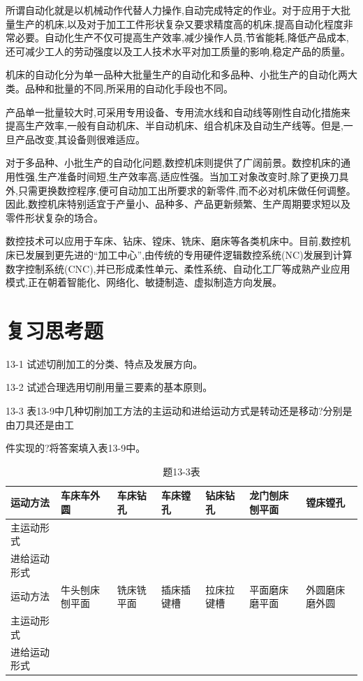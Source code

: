 \documentclass[UTF8]{ctexbook}
\newcommand{\◎}{\ensuremath{\bigcirc}}
\begin{document}
所谓自动化就是以机械动作代替人力操作,自动完成特定的作业。对于应用于大批量生产的机床,以及对于加工工件形状复杂又要求精度高的机床,提高自动化程度非常必要。自动化生产不仅可提高生产效率,减少操作人员,节省能耗,降低产品成本,还可减少工人的劳动强度以及工人技术水平对加工质量的影响,稳定产品的质量。

机床的自动化分为单一品种大批量生产的自动化和多品种、小批生产的自动化两大类。品种和批量的不同,所采用的自动化手段也不同。

产品单一批量较大时,可采用专用设备、专用流水线和自动线等刚性自动化措施来提高生产效率,一般有自动机床、半自动机床、组合机床及自动生产线等。但是,一旦产品改变,其设备则很难适应。

对于多品种、小批生产的自动化问题,数控机床则提供了广阔前景。数控机床的通用性强,生产准备时间短,生产效率高,适应性强。当加工对象改变时,除了更换刀具外,只需更换数控程序,便可自动加工出所要求的新零件,而不必对机床做任何调整。因此,数控机床特别适宜于产量小、品种多、产品更新频繁、生产周期要求短以及零件形状复杂的场合。

数控技术可以应用于车床、钻床、镗床、铣床、磨床等各类机床中。目前,数控机床已发展到更先进的“加工中心”,由传统的专用硬件逻辑数控系统(NC)发展到计算数字控制系统(CNC),并已形成柔性单元、柔性系统、自动化工厂等成熟产业应用模式,正在朝着智能化、网络化、敏捷制造、虚拟制造方向发展。

\section*{复习思考题}

 
13-1 试述切削加工的分类、特点及发展方向。

13-2 试述合理选用切削用量三要素的基本原则。

13-3 表13-9中几种切削加工方法的主运动和进给运动方式是转动还是移动?分别是由刀具还是由工

件实现的?将答案填入表13-9中。

\begin{table}[H]
\centering
\caption{题13-3表}
\label{tab:13-9}
\begin{tabular}{|m{2cm}|m{2cm}|m{2cm}|m{2cm}|m{2cm}|m{2cm}|m{2cm}|}
\hline
运动方法 & 车床车外圆 & 车床钻孔 & 车床镗孔 & 钻床钻孔 & 龙门刨床刨平面 & 镗床镗孔 \\
\hline
主运动形式 & & & & & & \\
\hline
进给运动形式 & & & & & & \\
\hline
\hline
运动方法 & 牛头刨床刨平面 & 铣床铣平面 & 插床插键槽 & 拉床拉键槽 & 平面磨床磨平面 & 外圆磨床磨外圆 \\
\hline
主运动形式 & & & & & & \\
\hline
进给运动形式 & & & & & & \\
\hline
\end{tabular}\end{table}
\end{document}

